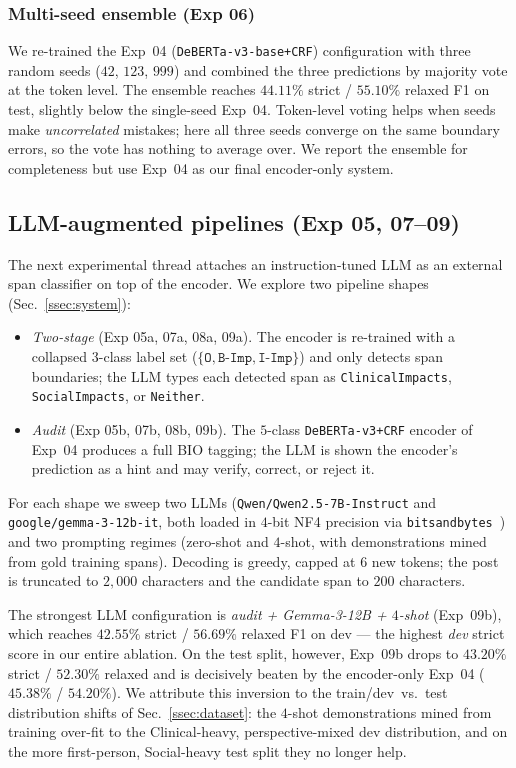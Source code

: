 \documentclass[journal]{IEEEtran}
\begin{document}
\subsubsection{Multi-seed ensemble (Exp 06)}
We re-trained the Exp~04 (\texttt{DeBERTa-v3-base+CRF}) configuration
with three random seeds ($42$, $123$, $999$) and combined the three
predictions by majority vote at the token level. The ensemble reaches
$44.11\%$ strict / $55.10\%$ relaxed F1 on test, slightly below the
single-seed Exp~04. Token-level voting helps when seeds make
\emph{uncorrelated} mistakes; here all three seeds converge on the
same boundary errors, so the vote has nothing to average over. We
report the ensemble for completeness but use Exp~04 as our final
encoder-only system.

\subsection{LLM-augmented pipelines (Exp 05, 07--09)}
\label{ssec:llm_augmented}
The next experimental thread attaches an instruction-tuned LLM as an
external span classifier on top of the encoder. We explore two
pipeline shapes (Sec.~\ref{ssec:system}):
\begin{itemize}
\item \emph{Two-stage} (Exp 05a, 07a, 08a, 09a). The encoder is
re-trained with a collapsed $3$-class label set
($\{\texttt{O}, \texttt{B-Imp}, \texttt{I-Imp}\}$) and only detects
span boundaries; the LLM types each detected span as
\texttt{ClinicalImpacts}, \texttt{SocialImpacts}, or
\texttt{Neither}.
\item \emph{Audit} (Exp 05b, 07b, 08b, 09b). The $5$-class
\texttt{DeBERTa-v3+CRF} encoder of Exp~04 produces a full BIO
tagging; the LLM is shown the encoder's prediction as a hint and may
verify, correct, or reject it.
\end{itemize}
For each shape we sweep two LLMs
(\texttt{Qwen/Qwen2.5-7B-Instruct} and
\texttt{google/gemma-3-12b-it}, both loaded in $4$-bit NF4 precision
via \texttt{bitsandbytes}~\cite{dettmers2023qlora}) and two prompting
regimes (zero-shot and $4$-shot, with demonstrations mined from gold
training spans). Decoding is greedy, capped at $6$ new tokens; the
post is truncated to $2{,}000$ characters and the candidate span to
$200$ characters.

The strongest LLM configuration is \emph{audit + Gemma-3-12B +
$4$-shot} (Exp~09b), which reaches $42.55\%$ strict / $56.69\%$
relaxed F1 on dev --- the highest \emph{dev} strict score in our
entire ablation. On the test split, however, Exp~09b drops to
$43.20\%$ strict / $52.30\%$ relaxed and is decisively beaten by the
encoder-only Exp~04 ($45.38\%$ / $54.20\%$). We attribute this
inversion to the train/dev~vs.~test distribution shifts of
Sec.~\ref{ssec:dataset}: the $4$-shot demonstrations mined from
training over-fit to the Clinical-heavy, perspective-mixed dev
distribution, and on the more first-person, Social-heavy test split
they no longer help.
\end{document}
